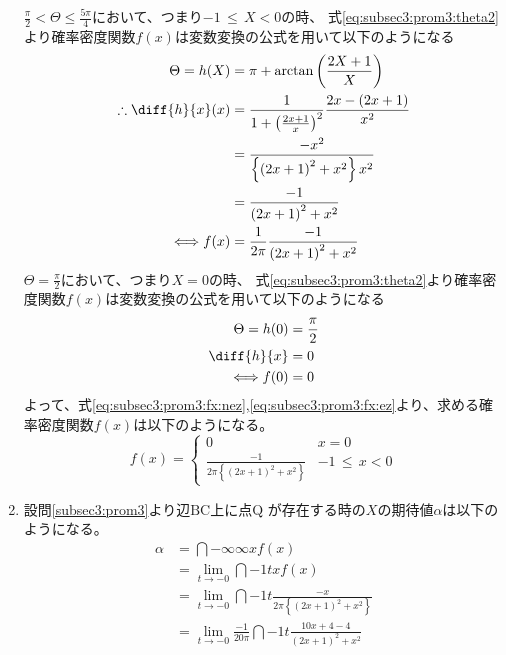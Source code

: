 \documentclass[dvipdfmx,titlepage, 11pt, a4paper]{jsarticle}%
\begin{document}
\begin{enumerate}[(1)]
    $\frac{\pi}{2} < \Theta \leq \frac{5\pi}{4}$において、つまり$ -1\, \leq\, X < 0$の時、
    式\eqref{eq:subsec3:prom3:theta2}より確率密度関数$f(x)$は変数変換の公式を用いて以下のようになる
    \begin{align}
        \Theta = h(X) &= \pi + \arctan\left(\frac{2X + 1}{X}\right) \nonumber\\
        \therefore \diff{h}{x}(x) &= \frac{1}{1 + \left(\frac{2x + 1}{x}\right)^2}\frac{2x - (2x + 1)}{x^2}\nonumber\\
        &= \frac{-x^2}{\left\{\left(2x + 1\right)^2 + x^2\right\}x^2}\nonumber\\
        &= \frac{-1}{\left(2x + 1\right)^2 + x^2}\nonumber\\
        \Longleftrightarrow 
        f(x) &= \frac{1}{2\pi}\frac{-1}{\left(2x + 1\right)^2 + x^2}\label{eq:subsec3:prom3:fx:nez}
    \end{align}
    $\Theta = \frac{\pi}{2}$において、つまり$X = 0$の時、
    式\eqref{eq:subsec3:prom3:theta2}より確率密度関数$f(x)$は変数変換の公式を用いて以下のようになる
    \begin{align}
        \Theta = h(0) &= \frac{\pi}{2}\nonumber\\
        \diff{h}{x} &= 0\nonumber\\
        \Longleftrightarrow f(0) &= 0\label{eq:subsec3:prom3:fx:ez}
    \end{align}
    よって、式\eqref{eq:subsec3:prom3:fx:nez},\eqref{eq:subsec3:prom3:fx:ez}より、求める確率密度関数$f(x)$は以下のようになる。
    \begin{equation*}
        f(x) = 
        \begin{cases}
            0 & x = 0\\
            \frac{-1}{2\pi\left\{\left(2x + 1\right)^2 + x^2\right\}} & -1\, \leq\, x < 0
        \end{cases}
    \end{equation*}
    \item 設問\eqref{subsec3:prom3}より辺$\mathrm{BC}$上に点$\mathrm{Q}$
    が存在する時の$X$の期待値$\alpha$は以下のようになる。
    \begin{align*}
        \alpha &= \dint{-\infty}{\infty}{xf(x)}\\
        &= \lim_{t \to -0}\dint{-1}{t}{xf(x)}\\
        &= \lim_{t \to -0}\dint{-1}{t}{\frac{-x}{2\pi\left\{\left(2x + 1\right)^2 + x^2\right\}}}\\
        &= \lim_{t \to -0}\frac{-1}{20\pi}\dint{-1}{t}{\frac{10x + 4 - 4}{\left(2x + 1\right)^2 + x^2}}\\

\end{align*}
\end{enumerate}
\end{document}
